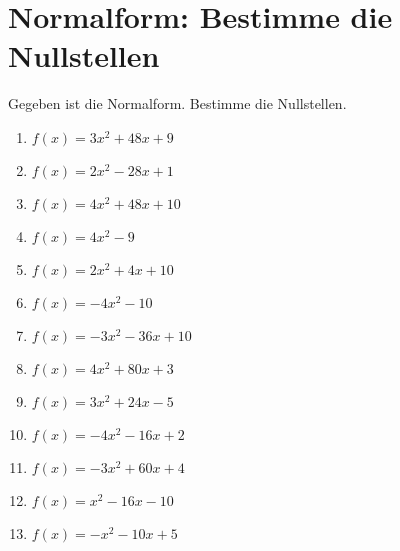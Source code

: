 \documentclass{article}%
\begin{document}
\section{Normalform: Bestimme die Nullstellen}%
\label{sec:NormalformBestimmedieNullstellen}%
Gegeben ist die Normalform. Bestimme die Nullstellen.%
\begin{enumerate}[label=\alph*)]%
\item%
\newline\vspace{0.5cm} $f(x)=3x^2 + 48x + 9$%
\item%
\newline\vspace{0.5cm} $f(x)=2x^2 - 28x + 1$%
\item%
\newline\vspace{0.5cm} $f(x)=4x^2 + 48x + 10$%
\item%
\newline\vspace{0.5cm} $f(x)=4x^2 - 9$%
\item%
\newline\vspace{0.5cm} $f(x)=2x^2 + 4x + 10$%
\item%
\newline\vspace{0.5cm} $f(x)=-4x^2 - 10$%
\item%
\newline\vspace{0.5cm} $f(x)=-3x^2 - 36x + 10$%
\item%
\newline\vspace{0.5cm} $f(x)=4x^2 + 80x + 3$%
\item%
\newline\vspace{0.5cm} $f(x)=3x^2 + 24x - 5$%
\item%
\newline\vspace{0.5cm} $f(x)=-4x^2 - 16x + 2$%
\item%
\newline\vspace{0.5cm} $f(x)=-3x^2 + 60x + 4$%
\item%
\newline\vspace{0.5cm} $f(x)=x^2 - 16x - 10$%
\item%
\newline\vspace{0.5cm} $f(x)=-x^2 - 10x + 5$%

\end{enumerate}
\end{document}

